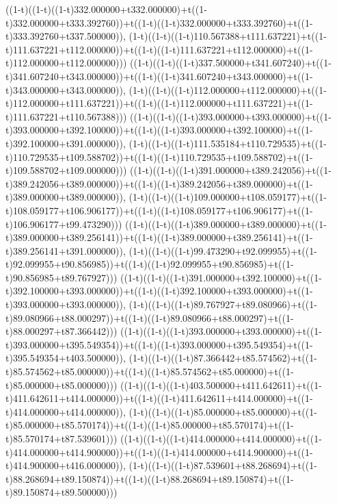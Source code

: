 ((1-t)((1-t)((1-t)332.000000+t332.000000)+t((1-t)332.000000+t333.392760))+t((1-t)((1-t)332.000000+t333.392760)+t((1-t)333.392760+t337.500000)),                                     (1-t)((1-t)((1-t)110.567388+t111.637221)+t((1-t)111.637221+t112.000000))+t((1-t)((1-t)111.637221+t112.000000)+t((1-t)112.000000+t112.000000)))
((1-t)((1-t)((1-t)337.500000+t341.607240)+t((1-t)341.607240+t343.000000))+t((1-t)((1-t)341.607240+t343.000000)+t((1-t)343.000000+t343.000000)),                                     (1-t)((1-t)((1-t)112.000000+t112.000000)+t((1-t)112.000000+t111.637221))+t((1-t)((1-t)112.000000+t111.637221)+t((1-t)111.637221+t110.567388)))
((1-t)((1-t)((1-t)393.000000+t393.000000)+t((1-t)393.000000+t392.100000))+t((1-t)((1-t)393.000000+t392.100000)+t((1-t)392.100000+t391.000000)),                                     (1-t)((1-t)((1-t)111.535184+t110.729535)+t((1-t)110.729535+t109.588702))+t((1-t)((1-t)110.729535+t109.588702)+t((1-t)109.588702+t109.000000)))
((1-t)((1-t)((1-t)391.000000+t389.242056)+t((1-t)389.242056+t389.000000))+t((1-t)((1-t)389.242056+t389.000000)+t((1-t)389.000000+t389.000000)),                                     (1-t)((1-t)((1-t)109.000000+t108.059177)+t((1-t)108.059177+t106.906177))+t((1-t)((1-t)108.059177+t106.906177)+t((1-t)106.906177+t99.473290)))
((1-t)((1-t)((1-t)389.000000+t389.000000)+t((1-t)389.000000+t389.256141))+t((1-t)((1-t)389.000000+t389.256141)+t((1-t)389.256141+t391.000000)),                                     (1-t)((1-t)((1-t)99.473290+t92.099955)+t((1-t)92.099955+t90.856985))+t((1-t)((1-t)92.099955+t90.856985)+t((1-t)90.856985+t89.767927)))
((1-t)((1-t)((1-t)391.000000+t392.100000)+t((1-t)392.100000+t393.000000))+t((1-t)((1-t)392.100000+t393.000000)+t((1-t)393.000000+t393.000000)),                                     (1-t)((1-t)((1-t)89.767927+t89.080966)+t((1-t)89.080966+t88.000297))+t((1-t)((1-t)89.080966+t88.000297)+t((1-t)88.000297+t87.366442)))
((1-t)((1-t)((1-t)393.000000+t393.000000)+t((1-t)393.000000+t395.549354))+t((1-t)((1-t)393.000000+t395.549354)+t((1-t)395.549354+t403.500000)),                                     (1-t)((1-t)((1-t)87.366442+t85.574562)+t((1-t)85.574562+t85.000000))+t((1-t)((1-t)85.574562+t85.000000)+t((1-t)85.000000+t85.000000)))
((1-t)((1-t)((1-t)403.500000+t411.642611)+t((1-t)411.642611+t414.000000))+t((1-t)((1-t)411.642611+t414.000000)+t((1-t)414.000000+t414.000000)),                                     (1-t)((1-t)((1-t)85.000000+t85.000000)+t((1-t)85.000000+t85.570174))+t((1-t)((1-t)85.000000+t85.570174)+t((1-t)85.570174+t87.539601)))
((1-t)((1-t)((1-t)414.000000+t414.000000)+t((1-t)414.000000+t414.900000))+t((1-t)((1-t)414.000000+t414.900000)+t((1-t)414.900000+t416.000000)),                                     (1-t)((1-t)((1-t)87.539601+t88.268694)+t((1-t)88.268694+t89.150874))+t((1-t)((1-t)88.268694+t89.150874)+t((1-t)89.150874+t89.500000)))
